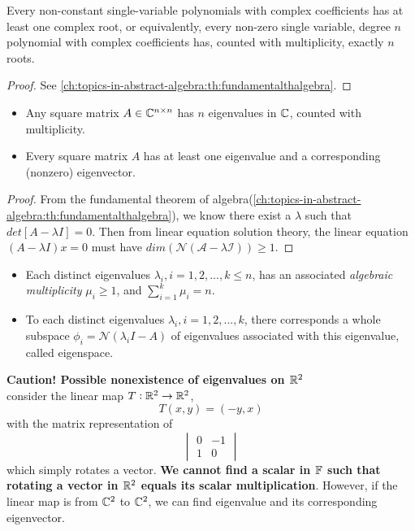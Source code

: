 \begin{refsection}
\begin{theorem} Every non-constant single-variable polynomials with complex coefficients has at least one complex root, or equivalently, every non-zero single variable, degree $n$ polynomial with complex coefficients has, counted with multiplicity, exactly $n$ roots. 
\end{theorem}
\begin{proof}
See \autoref{ch:topics-in-abstract-algebra:th:fundamentalthalgebra}.
\end{proof}


\begin{theorem}\label{ch:linearalgebra:th:existenceOfEigenvalueAndEigenvectors}\hfill
\begin{itemize}
	\item Any square matrix $A\in \mathbb{C}^{n\times n}$ has $n$ eigenvalues in $\mathbb{C}$, counted with multiplicity.
	\item Every square matrix $A$ has at least one eigenvalue and a corresponding (nonzero) eigenvector.
\end{itemize}	
\end{theorem}
\begin{proof}
From the fundamental theorem of algebra(\autoref{ch:topics-in-abstract-algebra:th:fundamentalthalgebra}), we know there exist a $\lambda$ such that $det[A-\lambda I] = 0$. Then from linear equation solution theory, the linear equation $(A-\lambda I)x=0$ must have $dim(\mathcal{N(A-\lambda I)}) \geq 1$.	
\end{proof}

\begin{remark}\hfill
\begin{itemize}
    \item Each distinct eigenvalues $\lambda_i,i=1,2,...,k \leq n$, has an associated \emph{algebraic multiplicity} $\mu_i \geq 1$, and $\sum_{i=1}^k\mu_i = n$.
    \item To each distinct eigenvalues $\lambda_i,i=1,2,...,k$, there corresponds a whole subspace $\phi_i = \mathcal{N}(\lambda_i I - A)$ of eigenvalues associated with this eigenvalue, called eigenspace.
\end{itemize}
\end{remark}

\begin{mdframed}
\textbf{Caution! Possible nonexistence of eigenvalues on $\mathbb{R}^2$}\\
consider the linear map $T:\mathbb{R}^2\to \mathbb{R}^2$, 
$$T(x,y) = (-y,x)$$
with the matrix representation of
$$
\begin{vmatrix}
    0 &-1\\1 & 0
\end{vmatrix}
$$
which simply rotates a vector. \textbf{We cannot find a scalar in $\mathbb{F}$ such that rotating a vector in $\mathbb{R}^2$ equals its scalar multiplication}. However, if the linear map is from $\mathbb{C}^2$ to $\mathbb{C}^2$, we can find eigenvalue and its corresponding eigenvector. \cite[135]{axler2015linear}
\end{mdframed}


\end{refsection}
